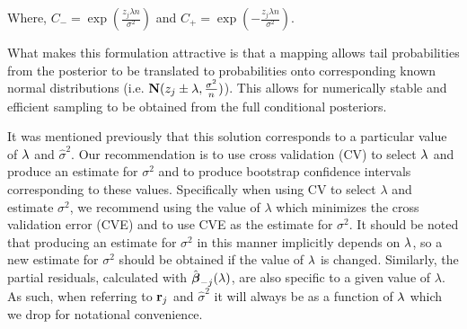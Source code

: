 
Where, $C_{-} = \exp(\frac{z_j \lambda n}{\sigma^2})$ and $C_{+} = \exp(-\frac{z_j \lambda n}{\sigma^2})$.

What makes this formulation attractive is that a mapping allows tail probabilities from the posterior to be translated to probabilities onto corresponding known normal distributions (i.e. $\mathbf{N}(z_j \pm \lambda, \frac{\sigma^2}{n})$). This allows for numerically stable and efficient sampling to be obtained from the full conditional posteriors.

It was mentioned previously that this solution corresponds to a particular value of $\lambda$ and $\hat{\sigma}^2$. Our recommendation is to use cross validation (CV) to select $\lambda$ and produce an estimate for $\sigma^2$ and to produce bootstrap confidence intervals corresponding to these values. Specifically when using CV to select $\lambda$ and estimate $\sigma^2$, we recommend using the value of $\lambda$ which minimizes the cross validation error (CVE) and to use CVE as the estimate for $\sigma^2$.  It should be noted that producing an estimate for $\sigma^2$ in this manner implicitly depends on $\lambda$, so a new estimate for $\sigma^2$ should be obtained if the value of $\lambda$ is changed. Similarly, the partial residuals, calculated with $\hat{\boldsymbol{\beta}}_{-j}(\lambda)$, are also specific to a given value of $\lambda$. As such, when referring to $\mathbf{r}_{j}$ and $\hat{\sigma}^2$ it will always be as a function of $\lambda$ which we drop for notational convenience.


